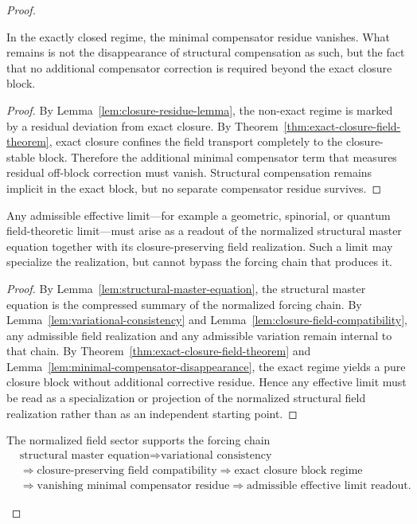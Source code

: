 \begin{proof}
\begin{lemma}
\label{lem:minimal-compensator-disappearance}
In the exactly closed regime, the minimal compensator residue vanishes. What
remains is not the disappearance of structural compensation as such, but the
fact that no additional compensator correction is required beyond the exact
closure block.
\end{lemma}

\begin{proof}
By Lemma~\ref{lem:closure-residue-lemma}, the non-exact regime is marked
by a residual deviation from exact closure. By
Theorem~\ref{thm:exact-closure-field-theorem}, exact closure confines the field
transport completely to the closure-stable block. Therefore the additional
minimal compensator term that measures residual off-block correction must
vanish. Structural compensation remains implicit in the exact block, but no
separate compensator residue survives.
\end{proof}

\begin{theorem}
\label{thm:effective-limit-theorem}
Any admissible effective limit---for example a geometric, spinorial, or quantum
field-theoretic limit---must arise as a readout of the normalized structural
master equation together with its closure-preserving field realization. Such a
limit may specialize the realization, but cannot bypass the forcing chain that
produces it.
\end{theorem}

\begin{proof}
By Lemma~\ref{lem:structural-master-equation}, the structural master equation is
the compressed summary of the normalized forcing chain. By
Lemma~\ref{lem:variational-consistency} and Lemma~\ref{lem:closure-field-compatibility},
any admissible field realization and any admissible variation remain internal to
that chain. By Theorem~\ref{thm:exact-closure-field-theorem} and
Lemma~\ref{lem:minimal-compensator-disappearance}, the exact regime yields a
pure closure block without additional corrective residue. Hence any effective
limit must be read as a specialization or projection of the normalized
structural field realization rather than as an independent starting point.
\end{proof}

\begin{corollary}
\label{cor:first-field-forcing-chain}
The normalized field sector supports the forcing chain
\[
\begin{aligned}
&\text{structural master equation} \Longrightarrow \text{variational consistency}\\
&\Longrightarrow \text{closure-preserving field compatibility} \Longrightarrow \text{exact closure block regime}\\
&\Longrightarrow \text{vanishing minimal compensator residue} \Longrightarrow \text{admissible effective limit readout}.
\end{aligned}
\]
\end{corollary}


\end{proof}
